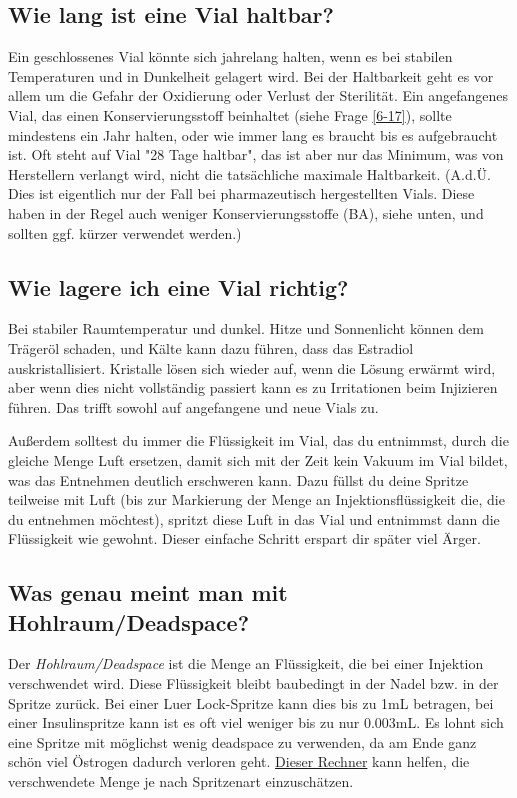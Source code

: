 \documentclass{article}
\begin{document}
\subsection{Wie lang ist eine Vial haltbar?}\label{5-24}

Ein geschlossenes Vial könnte sich jahrelang halten, wenn es bei stabilen Temperaturen und in Dunkelheit gelagert wird. Bei der Haltbarkeit geht es vor allem um die Gefahr der Oxidierung oder Verlust der Sterilität. Ein angefangenes Vial, das einen Konservierungsstoff beinhaltet (siehe Frage \ref{6-17}), sollte mindestens ein Jahr halten, oder wie immer lang es braucht bis es aufgebraucht ist. Oft steht auf Vial "28 Tage haltbar", das ist aber nur das Minimum, was von Herstellern verlangt wird, nicht die tatsächliche maximale Haltbarkeit. (A.d.Ü. Dies ist eigentlich nur der Fall bei pharmazeutisch hergestellten Vials. Diese haben in der Regel auch weniger Konservierungsstoffe (BA), siehe unten, und sollten ggf. kürzer verwendet werden.)

\subsection{Wie lagere ich eine Vial richtig?}\label{5-25}

Bei stabiler Raumtemperatur und dunkel. Hitze und Sonnenlicht können dem Trägeröl schaden, und Kälte kann dazu führen, dass das Estradiol auskristallisiert. Kristalle lösen sich wieder auf, wenn die Lösung erwärmt wird, aber wenn dies nicht vollständig passiert kann es zu Irritationen beim Injizieren führen. Das trifft sowohl auf angefangene und neue Vials zu.

Außerdem solltest du immer die Flüssigkeit im Vial, das du entnimmst, durch die gleiche Menge Luft ersetzen, damit sich mit der Zeit kein Vakuum im Vial bildet, was das Entnehmen deutlich erschweren kann. Dazu füllst du deine Spritze teilweise mit Luft (bis zur Markierung der Menge an Injektionsflüssigkeit die, die du entnehmen möchtest), spritzt diese Luft in das Vial und entnimmst dann die Flüssigkeit wie gewohnt. Dieser einfache Schritt erspart dir später viel Ärger.

\subsection{Was genau meint man mit Hohlraum/Deadspace?}\label{5-26}

Der \textit{Hohlraum/Deadspace} ist die Menge an Flüssigkeit, die bei einer Injektion verschwendet wird. Diese Flüssigkeit bleibt baubedingt in der Nadel bzw. in der Spritze zurück. Bei einer Luer Lock-Spritze kann dies bis zu 1mL betragen, bei einer Insulinspritze kann ist es oft viel weniger bis zu nur 0.003mL. Es lohnt sich eine Spritze mit möglichst wenig deadspace zu verwenden, da am Ende ganz schön viel Östrogen dadurch verloren geht. \href{https://hrtcafe.net/Calc/}{Dieser Rechner} kann helfen, die verschwendete Menge je nach Spritzenart einzuschätzen.
\end{document}
